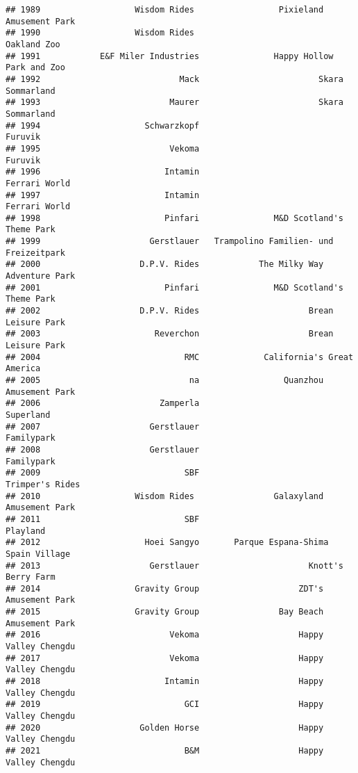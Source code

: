 \documentclass[
]{article}
\begin{document}
\begin{verbatim}
## 1989                   Wisdom Rides                 Pixieland Amusement Park
## 1990                   Wisdom Rides                              Oakland Zoo
## 1991            E&F Miler Industries               Happy Hollow Park and Zoo
## 1992                            Mack                        Skara Sommarland
## 1993                          Maurer                        Skara Sommarland
## 1994                     Schwarzkopf                                 Furuvik
## 1995                          Vekoma                                 Furuvik
## 1996                         Intamin                           Ferrari World
## 1997                         Intamin                           Ferrari World
## 1998                         Pinfari               M&D Scotland's Theme Park
## 1999                      Gerstlauer   Trampolino Familien- und Freizeitpark
## 2000                    D.P.V. Rides            The Milky Way Adventure Park
## 2001                         Pinfari               M&D Scotland's Theme Park
## 2002                    D.P.V. Rides                      Brean Leisure Park
## 2003                       Reverchon                      Brean Leisure Park
## 2004                             RMC             California's Great America 
## 2005                              na                 Quanzhou Amusement Park
## 2006                        Zamperla                               Superland
## 2007                      Gerstlauer                              Familypark
## 2008                      Gerstlauer                              Familypark
## 2009                             SBF                         Trimper's Rides
## 2010                   Wisdom Rides                Galaxyland Amusement Park
## 2011                             SBF                                Playland
## 2012                     Hoei Sangyo       Parque Espana-Shima Spain Village
## 2013                      Gerstlauer                      Knott's Berry Farm
## 2014                   Gravity Group                    ZDT's Amusement Park
## 2015                   Gravity Group                Bay Beach Amusement Park
## 2016                          Vekoma                    Happy Valley Chengdu
## 2017                          Vekoma                    Happy Valley Chengdu
## 2018                         Intamin                    Happy Valley Chengdu
## 2019                             GCI                    Happy Valley Chengdu
## 2020                    Golden Horse                    Happy Valley Chengdu
## 2021                             B&M                    Happy Valley Chengdu

\end{verbatim}
\end{document}
